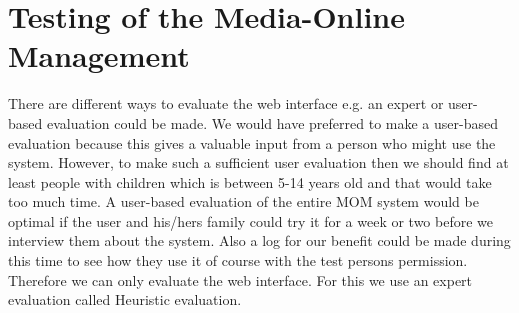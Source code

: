 \chapter{Testing of the Media-Online Management}
There are different ways to evaluate the web interface e.g. an expert or user-based evaluation could be made. We would have preferred to make a user-based evaluation because this gives a valuable input from a person who might use the system. However, to make such a sufficient user evaluation then we should find at least people with children which is between 5-14 years old and that would take too much time. A user-based evaluation of the entire MOM system would be optimal if the user and his/hers family could try it for a week or two before we interview them about the system. Also a log for our benefit could be made during this time to see how they use it of course with the test persons permission. Therefore we can only evaluate the web interface. For this we use an expert evaluation called Heuristic evaluation. 

